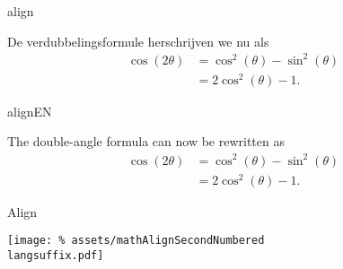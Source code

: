 \begin{saveblock}{align}
    \begin{highlightblock}[gobble=12,linewidth=\textwidth,
        framexleftmargin=0.25em,xleftmargin=0.25em]
        De verdubbelingsformule herschrijven we nu als
        \begin{align}
            \cos(2\theta) &= \cos^2(\theta) - \sin^2(\theta)
            \nonumber\\
            &= 2\cos^2(\theta)-1.
        \end{align}
    \end{highlightblock}
\end{saveblock}

\begin{saveblock}{alignEN}
    \begin{highlightblock}[gobble=12,linewidth=\textwidth,
        framexleftmargin=0.25em,xleftmargin=0.25em]
        The double-angle formula can now be rewritten as
        \begin{align}
            \cos(2\theta) &= \cos^2(\theta) - \sin^2(\theta)
            \nonumber\\
            &= 2\cos^2(\theta)-1.
        \end{align}
    \end{highlightblock}
\end{saveblock}


\begin{frame}{Align}

    \texttt{[image: \%
        assets/mathAlignSecondNumbered\\langsuffix.pdf]}
\end{frame}
